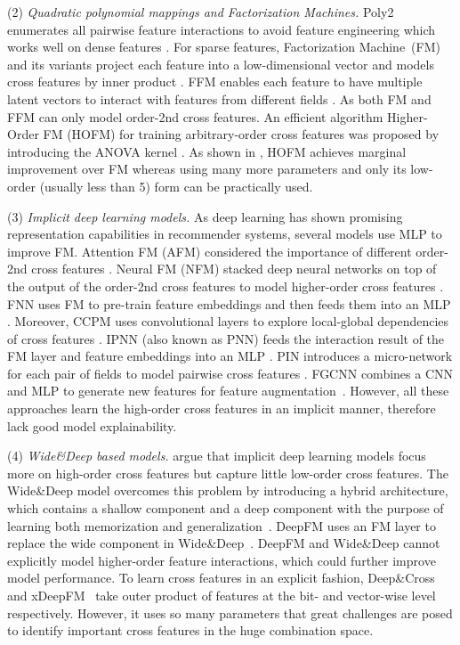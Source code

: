 \documentclass[letterpaper]{article} \usepackage{aaai21}  \usepackage{times}  \usepackage{helvet} \usepackage{courier}  \usepackage[hyphens]{url}  \usepackage{graphicx} \urlstyle{rm} \def\UrlFont{\rm}  \usepackage{natbib}  \usepackage{caption} \frenchspacing  \setlength{\pdfpagewidth}{8.5in}  \setlength{\pdfpageheight}{11in}  \usepackage{graphicx}
\begin{document}
(2) {\em Quadratic polynomial mappings and Factorization Machines.} Poly2 enumerates all pairwise feature interactions to avoid feature engineering which works well on dense features . For sparse features, Factorization Machine~(FM) and its variants project each feature into a low-dimensional vector and models cross features by inner product \cite{DBLP:conf/icdm/Rendle10}. 
FFM enables each feature to have multiple latent vectors to interact with features from different fields .
As both FM and FFM can only model order-2nd cross features. An efficient algorithm Higher-Order FM (HOFM) for training arbitrary-order cross features was proposed by introducing the ANOVA kernel . As shown in , HOFM achieves marginal improvement over FM whereas using many more parameters and only its low-order (usually less than 5) form can be practically used.

(3) {\em Implicit deep learning models.} As deep learning has shown promising representation capabilities in recommender systems, several models use MLP to improve FM. Attention FM (AFM) considered the importance of different order-2nd cross features . Neural FM (NFM) stacked deep neural networks on top of the output of the order-2nd cross features to model higher-order cross features .
FNN uses FM to pre-train feature embeddings and then feeds them into an MLP .
Moreover, CCPM uses convolutional layers to explore local-global dependencies of cross features .
IPNN (also known as PNN) feeds the interaction result of the FM layer and feature embeddings into an MLP . PIN introduces a micro-network for each pair of fields to model pairwise cross features . 
FGCNN combines a CNN and MLP to generate new features for feature augmentation~.
 However, all these approaches learn the high-order cross features in an implicit manner, therefore lack good model explainability.
 
(4) {\em Wide\&Deep based models.}  \citeauthor{lian2018xdeepfm} argue that implicit deep learning models focus more on high-order cross features but capture little low-order cross features. The Wide\&Deep model overcomes this problem by introducing a hybrid architecture, which contains a shallow component and a deep component with the purpose of learning both memorization and generalization~.
DeepFM uses an FM layer to replace the wide component in Wide\&Deep~. DeepFM and Wide\&Deep cannot explicitly model higher-order feature interactions, which could further improve model performance. To learn cross features in an explicit fashion, Deep\&Cross~ and xDeepFM~ take outer product of features at the bit- and vector-wise level respectively. However, it uses so many parameters that great challenges are posed to identify important cross features in the huge combination space.
\end{document}

